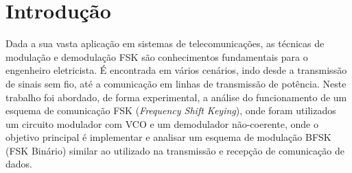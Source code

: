 \newpage

\section{Introdução}
Dada a sua vasta aplicação em sistemas de telecomunicações, as técnicas de modulação e demodulação FSK são conhecimentos fundamentais para o engenheiro eletricista. É encontrada em vários cenários, indo desde a transmissão de sinais sem fio, até a comunicação em linhas de transmissão de potência.
Neste trabalho foi abordado, de forma experimental, a análise do funcionamento de um esquema de comunicação FSK (\textit{Frequency Shift Keying}), onde foram utilizados um circuito modulador com VCO e um demodulador não-coerente, onde o objetivo principal é implementar e analisar um esquema de modulação BFSK (FSK Binário) similar ao utilizado na transmissão e recepção de comunicação de dados.